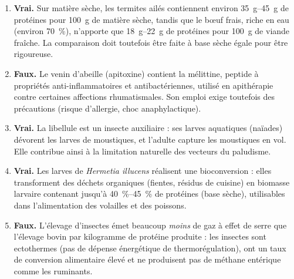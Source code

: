 \documentclass[11pt]{article}
\newcommand{\cle}[1]{{\popxbold\color{popdark}#1}}
\begin{document}
\begin{corrige}
\begin{enumerate}
\item \textbf{Vrai.} Sur matière sèche, les termites ailés contiennent environ \SIrange{35}{45}{g} de protéines pour \SI{100}{g} de matière sèche, tandis que le bœuf frais, riche en eau (environ \SI{70}{\percent}), n'apporte que \SIrange{18}{22}{g} de protéines pour \SI{100}{g} de viande fraîche. La comparaison doit toutefois être faite à base sèche égale pour être rigoureuse.
\item \textbf{Faux.} Le venin d'abeille (\cle{apitoxine}) contient la \cle{mélittine}, peptide à propriétés anti-inflammatoires et antibactériennes, utilisé en apithérapie contre certaines affections rhumatismales. Son emploi exige toutefois des précautions (risque d'allergie, choc anaphylactique).
\item \textbf{Vrai.} La libellule est un insecte \cle{auxiliaire} : ses larves aquatiques (naïades) dévorent les larves de moustiques, et l'adulte capture les moustiques en vol. Elle contribue ainsi à la limitation naturelle des vecteurs du paludisme.
\item \textbf{Vrai.} Les larves de \emph{Hermetia illucens} réalisent une \cle{bioconversion} : elles transforment des déchets organiques (fientes, résidus de cuisine) en biomasse larvaire contenant jusqu'à \SIrange{40}{45}{\percent} de protéines (base sèche), utilisables dans l'alimentation des volailles et des poissons.
\item \textbf{Faux.} L'élevage d'insectes émet beaucoup \emph{moins} de gaz à effet de serre que l'élevage bovin par kilogramme de protéine produite : les insectes sont ectothermes (pas de dépense énergétique de thermorégulation), ont un taux de conversion alimentaire élevé et ne produisent pas de méthane entérique comme les ruminants.
\end{enumerate}
\end{corrige}
\end{document}
